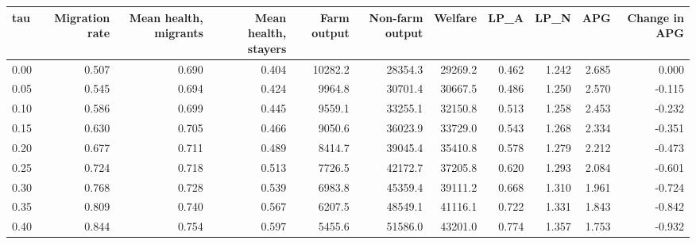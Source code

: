 \begin{tabular}{lrrrrrrrrrr}
\hline
tau & Migration rate & Mean health, migrants & Mean health, stayers & Farm output & Non-farm output & Welfare & LP\_A & LP\_N & APG & Change in APG \\
\hline
0.00 & 0.507 & 0.690 & 0.404 & 10282.2 & 28354.3 & 29269.2 & 0.462 & 1.242 & 2.685 & 0.000 \\
0.05 & 0.545 & 0.694 & 0.424 & 9964.8 & 30701.4 & 30667.5 & 0.486 & 1.250 & 2.570 & -0.115 \\
0.10 & 0.586 & 0.699 & 0.445 & 9559.1 & 33255.1 & 32150.8 & 0.513 & 1.258 & 2.453 & -0.232 \\
0.15 & 0.630 & 0.705 & 0.466 & 9050.6 & 36023.9 & 33729.0 & 0.543 & 1.268 & 2.334 & -0.351 \\
0.20 & 0.677 & 0.711 & 0.489 & 8414.7 & 39045.4 & 35410.8 & 0.578 & 1.279 & 2.212 & -0.473 \\
0.25 & 0.724 & 0.718 & 0.513 & 7726.5 & 42172.7 & 37205.8 & 0.620 & 1.293 & 2.084 & -0.601 \\
0.30 & 0.768 & 0.728 & 0.539 & 6983.8 & 45359.4 & 39111.2 & 0.668 & 1.310 & 1.961 & -0.724 \\
0.35 & 0.809 & 0.740 & 0.567 & 6207.5 & 48549.1 & 41116.1 & 0.722 & 1.331 & 1.843 & -0.842 \\
0.40 & 0.844 & 0.754 & 0.597 & 5455.6 & 51586.0 & 43201.0 & 0.774 & 1.357 & 1.753 & -0.932 \\
\hline
\end{tabular}
